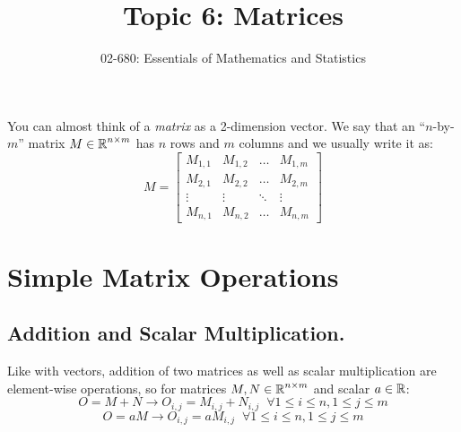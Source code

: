 


\title{Topic 6: Matrices}
\author{02-680: Essentials of Mathematics and Statistics}


\maketitle

You can almost think of a \emph{matrix} as a 2-dimension vector. 
We say that an ``$n$-by-$m$'' matrix $M \in \operatorname{\mathbb{R}}^{n\times m}$ has $n$ rows and $m$ columns and we usually write it as:
\[
M = \left[\begin{matrix}
M_{1,1}& 	M_{1,2}& 	\dots& M_{1,m}\\
M_{2,1}& 	M_{2,2}& 	\dots& M_{2,m}\\ 
\vdots & \vdots & \ddots & \vdots \\ 
M_{n,1}& 	M_{n,2}& 	\dots& M_{n,m}
\end{matrix}\right]
\]



\section{Simple Matrix Operations}

\subsection{Addition and Scalar Multiplication.}
Like with vectors, addition of two matrices as well as scalar multiplication are element-wise operations, so for matrices $M,N \in \operatorname{\mathbb{R}}^{n\times m}$ and scalar $a\in\operatorname{\mathbb{R}}$:
\[O = M+N \rightarrow O_{i,j} = M_{i,j} + N_{i,j} \;\; \forall 1 \le i \le n, 1 \le j \le m\]
\[O = aM \rightarrow O_{i,j} = a M_{i,j} \;\; \forall 1 \le i \le n, 1 \le j \le m\]

